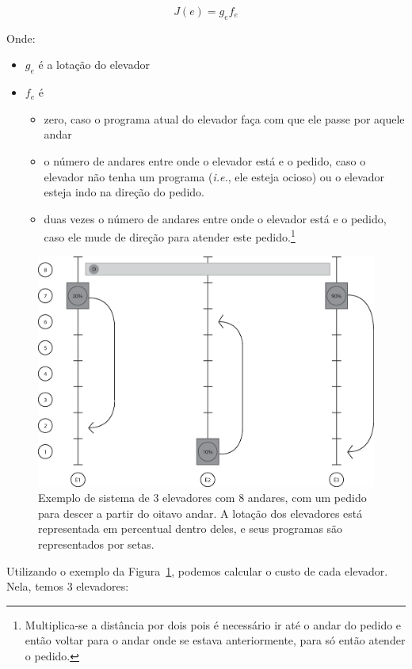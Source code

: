 \[
  J(e) = g_{e}f_{e}
\]

Onde:
\begin{itemize}
\item \textbf{$g_{e}$} é a lotação do elevador
\item \textbf{$f_{e}$} é
  \begin{itemize}
    \item zero, caso o programa atual do elevador faça com que ele passe por
      aquele andar
    \item o número de andares entre onde o elevador está e o pedido, caso o
      elevador não tenha um programa (\textit{i.e.}, ele esteja ocioso) ou o
      elevador esteja indo na direção do pedido.
    \item duas vezes o número de andares entre onde o elevador está e o pedido,
      caso ele mude de direção para atender este pedido.\footnote{Multiplica-se
        a distância por dois pois é necessário ir até o andar do pedido e então
        voltar para o andar onde se estava anteriormente, para só então atender
        o pedido.}
  \end{itemize}
\end{itemize}

\begin{figure}[htb!]
  \centering
  \includegraphics[scale=0.6]{img/elevator_example1.eps}
  \caption{Exemplo de sistema de 3 elevadores com 8 andares, com um pedido para
    descer a partir do oitavo andar. A lotação dos elevadores está representada
    em percentual dentro deles, e seus programas são representados por setas.}
  \label{fig:elevadores-1}
\end{figure}

Utilizando o exemplo da Figura~\ref{fig:elevadores-1}, podemos calcular o custo
de cada elevador. Nela, temos 3 elevadores:

